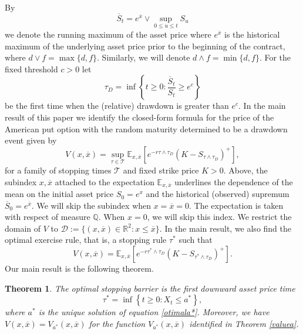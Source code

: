\documentclass[10pt,a4paper]{amsart}
\def\E{{\mathbb{E}}}
\def\Q{{\mathbb{Q}}}
\def \R{{{\rm I{\!}\rm R}}}
\def\E{{\mathbb E}} \def\PP{\mc P} \def\Z{{\mathbb Z}} \def\R{{\mathbb R}}
\newtheorem{Thm}{Theorem}
\begin{document}
	By
	\begin{equation*}
		\overline{S}_t = e^{\overline{x}}\vee \sup_{0 \leq u \leq t} S_u
	\end{equation*}
	we denote the running maximum of the asset price where
	$e^{\overline{x}}$ is the historical maximum of the underlying asset price prior to the beginning of the contract, where $d\vee f = \max\{d,f\}$. Similarly, we will denote $d\wedge f = \min\{d,f\}$.
	For the fixed threshold $c>0$ let
	\begin{equation*}
		\tau_D = \inf \left\{ t \geq 0: \frac{\overline{S}_t}{S_t} \geq e^c \right\}
	\end{equation*}
	be the first time when the (relative) drawdown is greater than $e^c$.
	In the main result of this paper we identify the closed-form formula for the price of the American put option with the random maturity determined to be a drawdown event given by
	\begin{equation*}
		V(x, \overline{x}) = \sup_{\tau \in \mathcal{T}} \E_{x,\overline{x}} \left[e^{-r\tau\wedge\tau_D}(K - S_{\tau\wedge\tau_D})^+\right],
	\end{equation*}
	for a family of stopping times $\mathcal{T}$ and fixed strike price $K > 0$.
	Above, the subindex $x,\overline{x}$ attached to the expectation $\E_{x,\overline{x}}$ underlines the dependence of the mean on
	the initial asset price $S_0=e^x$ and the historical (observed) supremum $\overline{S}_0=e^{\overline{x}}$. We will skip the subindex when $x=\overline{x}=0$.
	The expectation is taken with respect of measure $\Q$.
	When $x=0$, we will skip this index. We restrict the domain of $V$ to $\mathcal{D} := \{ (x, \overline{x}) \in \mathbb{R}^2 : x \leq \overline{x}\}$.
	In the main result, we also find the optimal exercise rule, that is, a stopping rule $\tau^*$ such that
	\begin{equation*}
		V(x, \overline{x}) = \E_{x,\overline{x}} [e^{-r\tau^*\wedge\tau_D}(K - S_{\tau^*\wedge\tau_D})^+].
	\end{equation*}
	Our main result is the following theorem.
	\begin{Thm}\label{thm2}
		The optimal stopping barrier is the first downward asset price time
		\begin{equation*}
			\tau^*=\inf\left\{t\geq 0: X_t\leq a^*\right\},
		\end{equation*}
		where $a^*$ is the unique solution of equation \eqref{otimala*}.
		Moreover, we have $V(x, \overline{x})=V_{a^*}(x, \overline{x})$
		for the function $V_{a^*}(x, \overline{x})$ identified in  Theorem \ref{valuea}.
	\end{Thm}
	
\end{document}
